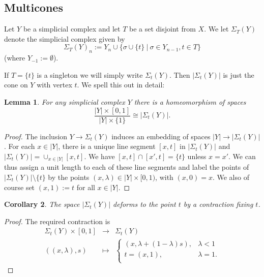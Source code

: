 \documentclass[12pt]{amsart}
\newtheorem{lem}{Lemma}[section]
\newtheorem{cor}[lem]{Corollary}
\theoremstyle{definition}
\newtheorem{rem}[lem]{Remark}
\newcommand{\<}{\langle}
\renewcommand{\>}{\rangle}
\newcommand{\mc}[2]{\Sigma_{#1}(#2)}
\begin{document}
\subsection{Multicones}  Let $Y$ be a simplicial complex and let $T$ be a set disjoint from $X$. We let $\mc{T}{Y}$ denote the simplicial complex given by
\[
\mc{T}{Y}_n:= Y_n\cup \{ \sigma\cup \{ t\}\  |\ \sigma\in Y_{n-1}, t\in T\}
\]
(where $Y_{-1}:=\emptyset$).




If $T=\{ t\}$ is a singleton we will simply write $\mc{t}{Y}$.  Then $|\mc{t}{Y}|$ is just the cone on $Y$ with vertex $t$. We spell this out in detail:

\begin{lem}\label{lem:cone}  For any simplicial complex $Y$ there is a homeomorphism of spaces 
\[
\frac{|Y|\times [0,1]}{|Y|\times \{ 1\}}\cong |\mc{t}{Y}|.
\]
\end{lem}
\begin{proof}
The inclusion $Y\to \mc{t}{Y}$ induces an embedding of spaces $|Y|\to |\mc{t}{Y}|$. For each $x\in |Y|$, there is a unique line segment $[x,t]$ in $|\mc{t}{Y}|$ and 
$|\mc{t}{Y}|=\cup_{x\in |Y|}[x,t]$. We have $[x,t]\cap [x',t]=\{ t\}$ unless $x=x'$. We can thus assign a unit length to each of these line segments and label the points of $|\mc{t}{Y}|\setminus\{ t\}$ by the points $(x,\lambda)\in |Y|\times [0,1)$, with $(x,0)=x$. We also of course set $(x,1):=t$ for all $x\in |Y|$.  
\end{proof}


\begin{cor}\label{lem:contract}   The space  $|\mc{t}{Y}|$ deforms to the point $t$ by a contraction fixing $t$.
\end{cor}

\begin{proof}
The required contraction is
\begin{eqnarray*}
\mc{t}{Y}\times [0,1]&\to& \mc{t}{Y}\\
((x,\lambda),s)&\mapsto &\left\{
\begin{array}{ll}
(x,\lambda+(1-\lambda)s),& \lambda <1\\
t=(x,1),&\lambda=1.\\
\end{array}
\right.
\end{eqnarray*}

\end{proof}
\end{document}
